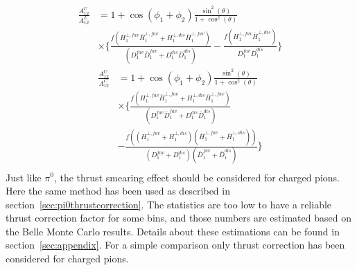 \begin{equation}
\begin{aligned}
\frac{A^{U}_{12}}{A^L_{12}}&=1+\cos(\phi_1+\phi_2)\frac{\sin^2(\theta)}{1+\cos^2(\theta)}\\
&\times\bigg\{\frac{f(H^{\bot,fav}_1\bar{H}^{\bot,fav}_1+H^{\bot,dis}_1\bar{H}^{\bot,fav}_1)}{(D^{fav}_1\bar{D}^{fav}_1+D^{dis}_1\bar{D}^{dis}_1)}-\frac{f(H^{\bot,fav}_1\bar{H}^{\bot,dis}_1)}{D^{fav}_1\bar{D}^{dis}_1} \bigg\} 
\end{aligned}
\label{eqn:allratiosexpress2}
\end{equation}
\begin{equation}
\begin{aligned}
\frac{A^{U}_{12}}{A^C_{12}}&=1+\cos(\phi_1+\phi_2)\frac{\sin^2(\theta)}{1+\cos^2(\theta)}\\
&\times\bigg\{\frac{f(H^{\bot,fav}_1\bar{H}^{\bot,fav}_1+H^{\bot,dis}_1\bar{H}^{\bot,fav}_1)}{(D^{fav}_1\bar{D}^{fav}_1+D^{dis}_1\bar{D}^{dis}_1)}\\
&-\frac{f((H^{\bot,fav}_1+H^{\bot,dis}_1)(\bar{H}^{\bot,fav}_1+\bar{H}^{\bot,dis}_1))}{(D^{fav}_1+D^{dis}_1)(\bar{D}^{fav}_1+\bar{D}^{dis}_1)} \bigg\} \\
\end{aligned}
\label{eqn:allratiosexpress3}
\end{equation}
Just like $\pi^0$, the thrust smearing effect should be considered for charged pions. Here the same method has been used as described in section~\ref{sec:pi0thrustcorrection}. The statistics are too low to have a reliable thrust correction factor for some bins, and those numbers are estimated based on the Belle Monte Carlo results. Details about these estimations can be found in section~\ref{sec:appendix}. For a simple comparison only thrust correction has been considered for charged pions.
\iffalse
